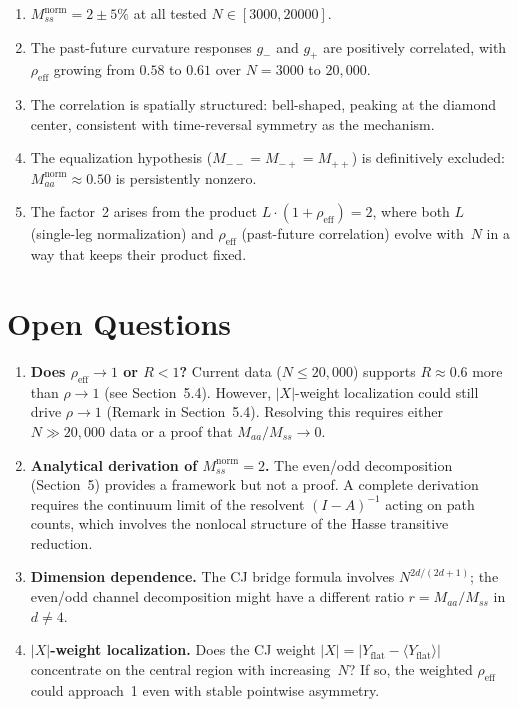 \documentclass[11pt,a4paper]{article}
\begin{document}
\begin{enumerate}
\item $M_{ss}^{\mathrm{norm}} = 2 \pm 5\%$ at all tested $N \in [3000, 20000]$.

\item The past-future curvature responses $g_-$ and $g_+$ are positively correlated,
with $\rho_{\mathrm{eff}}$ growing from $0.58$ to $0.61$ over $N = 3000$ to $20{,}000$.

\item The correlation is spatially structured: bell-shaped, peaking at the diamond center,
consistent with time-reversal symmetry as the mechanism.

\item The equalization hypothesis ($M_{--} = M_{-+} = M_{++}$) is definitively excluded:
$M_{aa}^{\mathrm{norm}} \approx 0.50$ is persistently nonzero.

\item The factor~2 arises from the product $L \cdot (1 + \rho_{\mathrm{eff}}) = 2$,
where both $L$ (single-leg normalization) and $\rho_{\mathrm{eff}}$ (past-future correlation)
evolve with~$N$ in a way that keeps their product fixed.
\end{enumerate}

\section{Open Questions}

\begin{enumerate}
\item \textbf{Does $\rho_{\mathrm{eff}} \to 1$ or $R < 1$?}
  Current data ($N \leq 20{,}000$) supports $R \approx 0.6$ more
  than $\rho \to 1$ (see Section~5.4).  However, $|X|$-weight
  localization could still drive $\rho \to 1$ (Remark in Section~5.4).
  Resolving this requires either $N \gg 20{,}000$ data or a proof
  that $M_{aa}/M_{ss} \to 0$.

\item \textbf{Analytical derivation of $M_{ss}^{\mathrm{norm}} = 2$.}
  The even/odd decomposition (Section~5) provides a framework but not
  a proof.  A complete derivation requires the continuum limit of the
  resolvent $(I - A)^{-1}$ acting on path counts, which involves the
  nonlocal structure of the Hasse transitive reduction.

\item \textbf{Dimension dependence.}
  The CJ bridge formula involves $N^{2d/(2d+1)}$; the even/odd channel
  decomposition might have a different ratio $r = M_{aa}/M_{ss}$ in $d \neq 4$.

\item \textbf{$|X|$-weight localization.}
  Does the CJ weight $|X| = |Y_{\mathrm{flat}} - \langle Y_{\mathrm{flat}}\rangle|$
  concentrate on the central region with increasing~$N$?  If so, the
  weighted $\rho_{\mathrm{eff}}$ could approach~1 even with stable
  pointwise asymmetry.
\end{enumerate}
\end{document}
